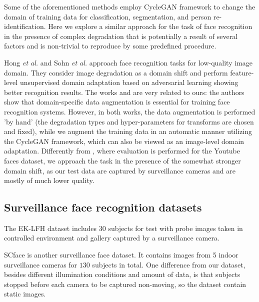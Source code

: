 Some of the aforementioned methods \cite{Hoffman17,Deng_2018_CVPR,Murez_2018_CVPR} employ CycleGAN framework  to change the domain of training data for classification, segmentation, and person re-identification. Here we explore a similar approach for the task of face recognition in the presence of complex degradation  that  is potentially a result of several factors and is non-trivial to reproduce by some predefined procedure.

Hong \textit{et al.} \cite{HongIRY17} and
Sohn \textit{et al.} \cite{SohnLZY0C17} approach face recognition tasks for low-quality image domain. They consider image degradation as a domain shift and perform feature-level unsupervised domain adaptation based on adversarial learning showing better recognition results. 
The works \cite{HongIRY17} and \cite{SohnLZY0C17} are very related to ours: the authors show that domain-specific data augmentation is essential for training face recognition systems. 
 However, in both works, the data augmentation is performed 'by hand' (the degradation types and hyper-parameters for transforms are chosen and fixed), while we augment the training data in an automatic manner utilizing the CycleGAN framework, which can also be viewed as an image-level domain adaptation.
Differently from \cite{SohnLZY0C17}, where evaluation is performed for the Youtube faces dataset, we approach the task in the presence of the somewhat stronger domain shift, as our test data are captured by surveillance cameras and are mostly of much lower quality.

\subsection{Surveillance face recognition datasets}

The EK-LFH dataset \cite{HongIRY17} includes $30$ subjects for test with probe images taken in controlled environment and gallery captured by a surveillance camera. 

SCface \cite{grgic2011scface} is another surveillance face dataset. It contains images from 5 indoor surveillance cameras for $130$ subjects in total. One difference from our dataset, besides different illumination conditions and amount of data, is that subjects stopped before each camera to be captured non-moving, so the dataset contain static images.

